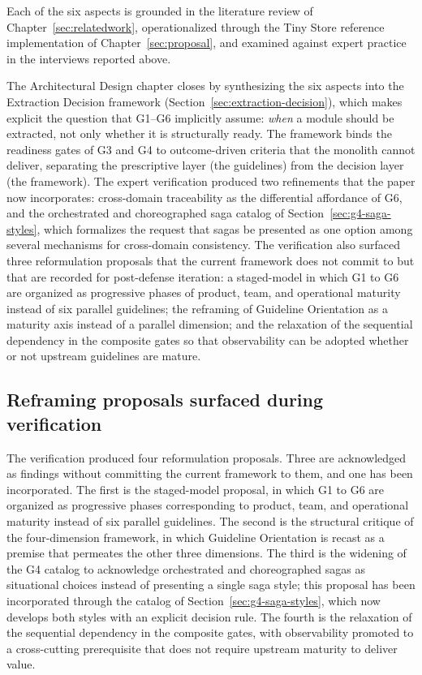 Each of the six aspects is grounded in the literature review of Chapter~\ref{sec:relatedwork}, operationalized through the Tiny Store reference implementation of Chapter~\ref{sec:proposal}, and examined against expert practice in the interviews reported above.

The Architectural Design chapter closes by synthesizing the six aspects into the Extraction Decision framework (Section~\ref{sec:extraction-decision}), which makes explicit the question that G1--G6 implicitly assume: \emph{when} a module should be extracted, not only whether it is structurally ready. The framework binds the readiness gates of G3 and G4 to outcome-driven criteria that the monolith cannot deliver, separating the prescriptive layer (the guidelines) from the decision layer (the framework). The expert verification produced two refinements that the paper now incorporates: cross-domain traceability as the differential affordance of G6, and the orchestrated and choreographed saga catalog of Section~\ref{sec:g4-saga-styles}, which formalizes the request that sagas be presented as one option among several mechanisms for cross-domain consistency. The verification also surfaced three reformulation proposals that the current framework does not commit to but that are recorded for post-defense iteration: a staged-model in which G1 to G6 are organized as progressive phases of product, team, and operational maturity instead of six parallel guidelines; the reframing of Guideline Orientation as a maturity axis instead of a parallel dimension; and the relaxation of the sequential dependency in the composite gates so that observability can be adopted whether or not upstream guidelines are mature.

\subsection*{Reframing proposals surfaced during verification}

The verification produced four reformulation proposals. Three are acknowledged as findings without committing the current framework to them, and one has been incorporated. The first is the staged-model proposal, in which G1 to G6 are organized as progressive phases corresponding to product, team, and operational maturity instead of six parallel guidelines. The second is the structural critique of the four-dimension framework, in which Guideline Orientation is recast as a premise that permeates the other three dimensions. The third is the widening of the G4 catalog to acknowledge orchestrated and choreographed sagas as situational choices instead of presenting a single saga style; this proposal has been incorporated through the catalog of Section~\ref{sec:g4-saga-styles}, which now develops both styles with an explicit decision rule. The fourth is the relaxation of the sequential dependency in the composite gates, with observability promoted to a cross-cutting prerequisite that does not require upstream maturity to deliver value.

